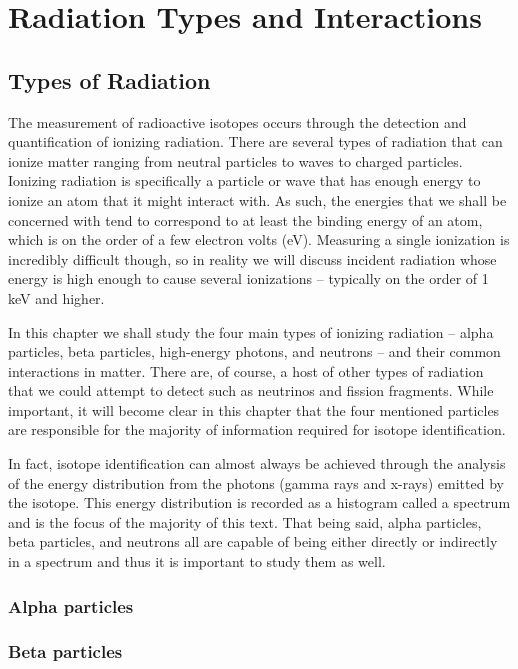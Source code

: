 \chapter{Radiation Types and Interactions}

\section{Types of Radiation}

The measurement of radioactive isotopes occurs through the detection and quantification of ionizing radiation.  There are several types of radiation that can ionize matter ranging from neutral particles to waves to charged particles.  Ionizing radiation is specifically a particle or wave that has enough energy to ionize an atom that it might interact with.  As such, the energies that we shall be concerned with tend to correspond to at least the binding energy of an atom, which is on the order of a few electron volts (eV).  Measuring a single ionization is incredibly difficult though, so in reality we will discuss incident radiation whose energy is high enough to cause several ionizations -- typically on the order of 1 keV and higher.

In this chapter we shall study the four main types of ionizing radiation --  alpha particles, beta particles, high-energy photons, and neutrons -- and their common interactions in matter.  There are, of course, a host of other types of radiation that we could attempt to detect such as neutrinos and fission fragments.  While important, it will become clear in this chapter that the four mentioned particles are responsible for the majority of information required for isotope identification.  

In fact, isotope identification can almost always be achieved through the analysis of the energy distribution from the photons (gamma rays and x-rays) emitted by the isotope.  This energy distribution is recorded as a histogram called a spectrum and is the focus of the majority of this text.  That being said, alpha particles, beta particles, and neutrons all are capable of being either directly or indirectly in a spectrum and thus it is important to study them as well.

\subsection{Alpha particles}
\subsection{Beta particles}
